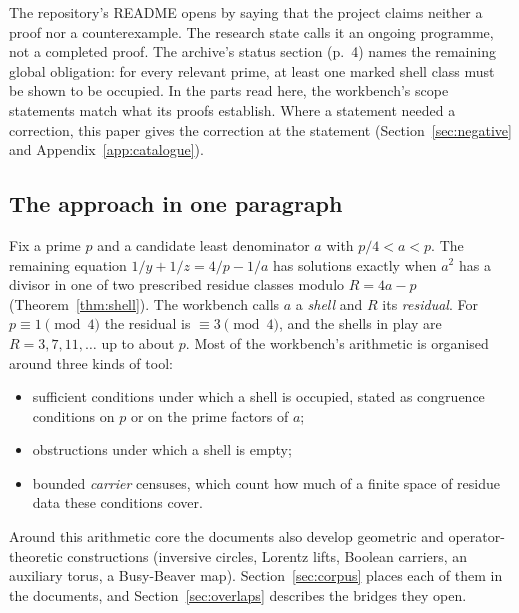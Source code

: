 The repository's README opens by saying that the project claims neither a proof nor a counterexample. The research state calls it an ongoing programme, not a completed proof. The archive's status section (p.~4) names the remaining global obligation: for every relevant prime, at least one marked shell class must be shown to be occupied.
In the parts read here, the workbench's scope statements match what its proofs establish. Where a statement needed a correction, this paper gives the correction at the statement (Section~\ref{sec:negative} and Appendix~\ref{app:catalogue}).

\subsection{The approach in one paragraph}

Fix a prime $p$ and a candidate least denominator $a$ with $p/4<a<p$. The remaining equation $1/y+1/z=4/p-1/a$ has solutions exactly when $a^2$ has a divisor in one of two prescribed residue classes modulo $R=4a-p$ (Theorem~\ref{thm:shell}). The workbench calls $a$ a \emph{shell} and $R$ its \emph{residual}. For $p\equiv1\pmod4$ the residual is $\equiv3\pmod4$, and the shells in play are $R=3,7,11,\dots$ up to about $p$.
Most of the workbench's arithmetic is organised around three kinds of tool:
\begin{itemize}
\item sufficient conditions under which a shell is occupied, stated as congruence conditions on $p$ or on the prime factors of $a$;
\item obstructions under which a shell is empty;
\item bounded \emph{carrier} censuses, which count how much of a finite space of residue data these conditions cover.
\end{itemize}
Around this arithmetic core the documents also develop geometric and operator-theoretic constructions (inversive circles, Lorentz lifts, Boolean carriers, an auxiliary torus, a Busy-Beaver map). Section~\ref{sec:corpus} places each of them in the documents, and Section~\ref{sec:overlaps} describes the bridges they open.
